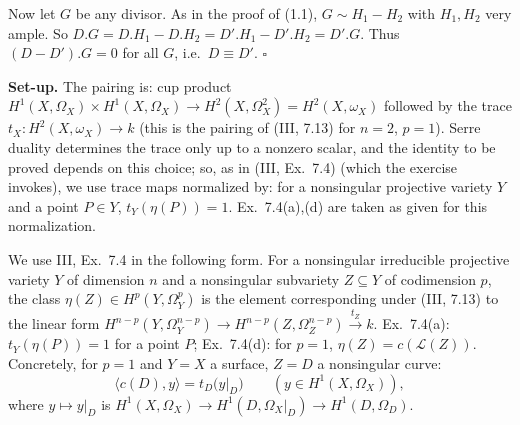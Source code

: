 \documentclass[11pt]{article}
\begin{document}
Now let $G$ be any divisor. As in the proof of (1.1), $G\sim H_1-H_2$ with $H_1,H_2$ very ample. So $D.G=D.H_1-D.H_2=D'.H_1-D'.H_2=D'.G$. Thus $(D-D').G=0$ for all $G$, i.e.\ $D\equiv D'$. \hfill$\square$

\pf
\textbf{Set-up.} The pairing is: cup product $H^1(X,\Omega_X)\times H^1(X,\Omega_X)\to H^2(X,\Omega^2_X)=H^2(X,\omega_X)$ followed by the trace $t_X:H^2(X,\omega_X)\to k$ (this is the pairing of (III, 7.13) for $n=2$, $p=1$). Serre duality determines the trace only up to a nonzero scalar, and the identity to be proved depends on this choice; so, as in (III, Ex.~7.4) (which the exercise invokes), we use trace maps normalized by: for a nonsingular projective variety $Y$ and a point $P\in Y$, $t_Y(\eta(P))=1$. Ex.~7.4(a),(d) are taken as given for this normalization.

We use III, Ex.~7.4 in the following form. For a nonsingular irreducible projective variety $Y$ of dimension $n$ and a nonsingular subvariety $Z\subseteq Y$ of codimension $p$, the class $\eta(Z)\in H^p(Y,\Omega^p_Y)$ is the element corresponding under (III, 7.13) to the linear form $H^{n-p}(Y,\Omega^{n-p}_Y)\to H^{n-p}(Z,\Omega^{n-p}_Z)\xrightarrow{t_Z}k$. Ex.~7.4(a): $t_Y(\eta(P))=1$ for a point $P$; Ex.~7.4(d): for $p=1$, $\eta(Z)=c(\mathcal L(Z))$. Concretely, for $p=1$ and $Y=X$ a surface, $Z=D$ a nonsingular curve:
\[ \langle c(D),y\rangle=t_D\bigl(y|_D\bigr)\qquad(y\in H^1(X,\Omega_X)),\tag{$*$} \]
where $y\mapsto y|_D$ is $H^1(X,\Omega_X)\to H^1(D,\Omega_X|_D)\to H^1(D,\Omega_D)$.
\end{document}

